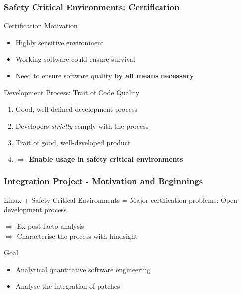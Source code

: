 \documentclass{beamer}
\begin{document}
	\begin{frame}
	\frametitle{Safety Critical Environments: Certification}
		\begin{block}{Certification Motivation}
			\begin{itemize}
				\item Highly sensitive environment
				\item Working software could ensure survival
				\item Need to ensure software quality \textbf{by all means necessary}
			\end{itemize}
		\end{block}
		\begin{block}{Development Process: Trait of Code Quality}
			\begin{enumerate}
				\item Good, well-defined development process\\ 
				\item Developers \textit{strictly} comply with the process\\
				\item Trait of good, well-developed product\\
				\item $\Rightarrow$ \textbf{Enable usage in safety critical environments}
			\end{enumerate}
		\end{block}

	\end{frame}

	\begin{frame}
	\frametitle{Integration Project - Motivation and Beginnings}
		\begin{block}{Linux + Safety Critical Environments}
			= Major certification problems: Open development process
		\end{block}
		$\Rightarrow$ Ex post facto analysis\\ 
		$\Rightarrow$ Characterise the process with hindsight

		\begin{alertblock}{Goal}
			\begin{itemize}
				\item Analytical quantitative software engineering
				\item Analyse the integration of patches
			\end{itemize}
		\end{alertblock}
	\end{frame}
\end{document}
